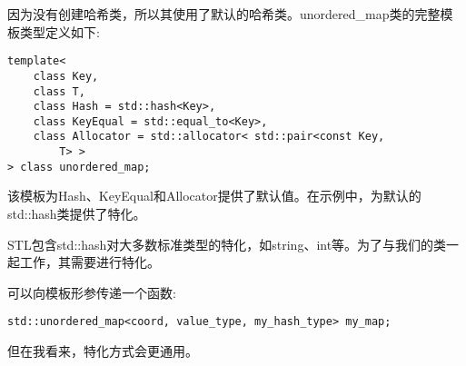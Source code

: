 因为没有创建哈希类，所以其使用了默认的哈希类。unordered\_map类的完整模板类型定义如下:

\begin{lstlisting}[style=styleCXX]
template<
	class Key,
	class T,
	class Hash = std::hash<Key>,
	class KeyEqual = std::equal_to<Key>,
	class Allocator = std::allocator< std::pair<const Key,
		T> >
> class unordered_map;
\end{lstlisting}

该模板为Hash、KeyEqual和Allocator提供了默认值。在示例中，为默认的std::hash类提供了特化。

STL包含std::hash对大多数标准类型的特化，如string、int等。为了与我们的类一起工作，其需要进行特化。

可以向模板形参传递一个函数:

\begin{lstlisting}[style=styleCXX]
std::unordered_map<coord, value_type, my_hash_type> my_map;
\end{lstlisting}

但在我看来，特化方式会更通用。





